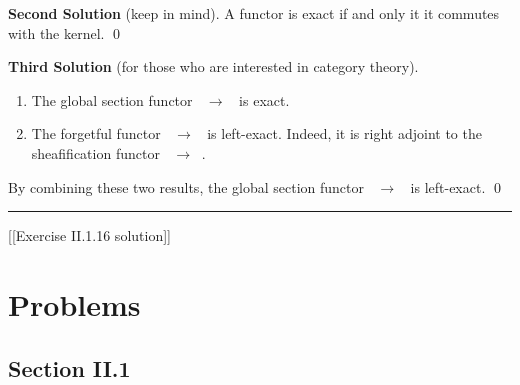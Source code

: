 \documentclass{article}
\newcommand{\separater}{\begin{center} \rule{0.5\linewidth}{0.3pt} \end{center}}
\theoremstyle{plain}
\theoremstyle{definition}
\DeclareMathOperator{\Ab}{\underline{\textsf{Ab}}}
\DeclareMathOperator{\PSh}{\underline{\textsf{PSh}}}
\DeclareMathOperator{\Sh}{\underline{\textsf{Sh}}}
\begin{document}
\begin{tcolorbox}
    \textbf{Second Solution} (keep in mind). A functor is exact if and only it it commutes with the kernel. \qed
\end{tcolorbox}

\begin{tcolorbox}
    \textbf{Third Solution} (for those who are interested in category theory).

    \begin{enumerate}[label=\fbox{\arabic*}]
        \item The global section functor $\PSh \to \Ab$ is exact.
        \item The forgetful functor $\Sh \to \PSh$ is left-exact. Indeed, it is right adjoint to the sheafification functor $\PSh \to \Sh$.
    \end{enumerate}

    By combining these two results, the global section functor $\Sh \to \Ab$ is left-exact. \qed
\end{tcolorbox}

\separater

[[Exercise II.1.16 solution]]

\newpage

\section*{Problems}

\subsection*{Section II.1}
\end{document}
